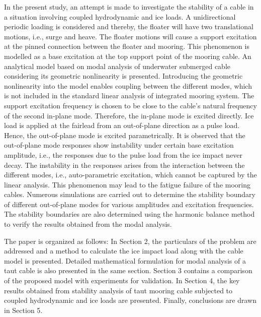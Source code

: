 \documentclass[review]{elsarticle}
\begin{document}
In the present study, an attempt is made to investigate the stability of a cable in a situation involving coupled hydrodynamic and ice loads. A unidirectional periodic loading is considered and thereby, the floater will have two translational motions, i.e., surge and heave. The floater motions will cause a support excitation at the pinned connection between the floater and mooring. This phenomenon is modelled as a base excitation at the top support point of the mooring cable. An analytical model based on modal analysis of underwater submerged cable considering its geometric nonlinearity is presented. Introducing the geometric nonlinearity into the model enables coupling between the different modes, which is not included in the standard linear analysis of integrated mooring system. The support excitation frequency is chosen to be close to the cable's natural frequency of the second in-plane mode. Therefore, the in-plane mode is excited directly. Ice load is applied at the fairlead from an out-of-plane direction as a pulse load. Hence, the out-of-plane  mode is  excited  parametrically. It is observed that the out-of-plane mode responses show instability under certain base excitation amplitude, i.e., the responses due to the pulse load from the ice impact never decay. The instability in the responses arises from the interaction between the different modes, i.e., auto-parametric excitation, which cannot be captured by the linear analysis. This phenomenon may lead to the fatigue failure of the mooring cables. Numerous simulations are carried out to determine the stability boundary of different out-of-plane modes for various amplitudes and excitation frequencies. The stability boundaries are also determined using the harmonic balance method to verify the results obtained from the modal analysis. 

The paper is organized as follows: In Section 2, the particulars of the problem are addressed and a method to calculate the ice impact load along with the cable model is presented. Detailed mathematical formulation for modal analysis of a taut cable is also presented in the same section. Section 3 contains a comparison of the proposed model with experiments for validation. In Section 4, the key results obtained from stability analysis of taut mooring cable subjected to coupled hydrodynamic and ice loads are presented. Finally, conclusions are drawn in Section 5.
\end{document}
